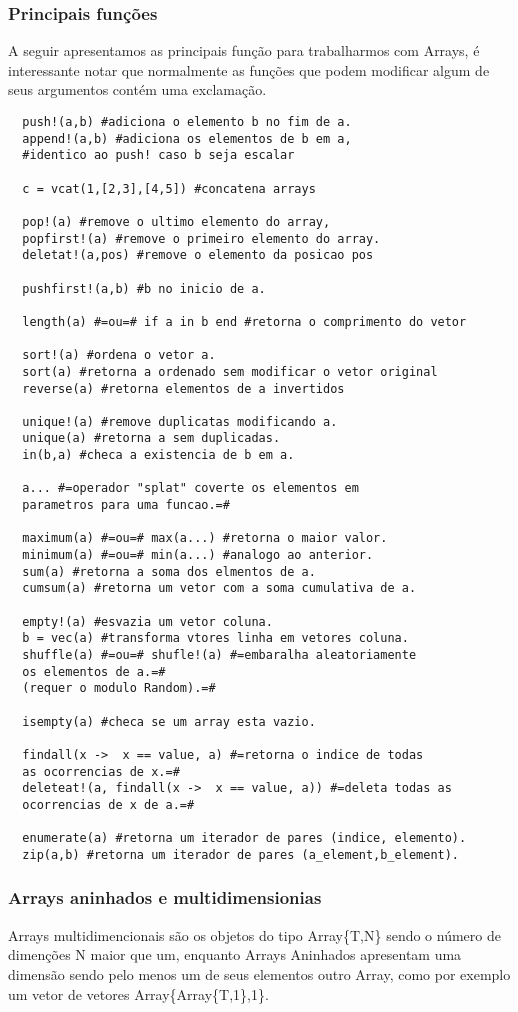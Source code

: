 \subsubsection{Principais funções}
A seguir apresentamos as principais função para trabalharmos com Arrays, é interessante notar que normalmente as funções que podem modificar algum de seus argumentos contém uma exclamação.
\begin{lstlisting}
  push!(a,b) #adiciona o elemento b no fim de a.
  append!(a,b) #adiciona os elementos de b em a,
  #identico ao push! caso b seja escalar

  c = vcat(1,[2,3],[4,5]) #concatena arrays

  pop!(a) #remove o ultimo elemento do array,
  popfirst!(a) #remove o primeiro elemento do array.
  deletat!(a,pos) #remove o elemento da posicao pos

  pushfirst!(a,b) #b no inicio de a.

  length(a) #=ou=# if a in b end #retorna o comprimento do vetor

  sort!(a) #ordena o vetor a.
  sort(a) #retorna a ordenado sem modificar o vetor original
  reverse(a) #retorna elementos de a invertidos

  unique!(a) #remove duplicatas modificando a.
  unique(a) #retorna a sem duplicadas. 
  in(b,a) #checa a existencia de b em a.

  a... #=operador "splat" coverte os elementos em 
  parametros para uma funcao.=#

  maximum(a) #=ou=# max(a...) #retorna o maior valor.
  minimum(a) #=ou=# min(a...) #analogo ao anterior.
  sum(a) #retorna a soma dos elmentos de a.
  cumsum(a) #retorna um vetor com a soma cumulativa de a.

  empty!(a) #esvazia um vetor coluna.
  b = vec(a) #transforma vtores linha em vetores coluna.
  shuffle(a) #=ou=# shufle!(a) #=embaralha aleatoriamente 
  os elementos de a.=# 
  (requer o modulo Random).=#

  isempty(a) #checa se um array esta vazio.

  findall(x ->  x == value, a) #=retorna o indice de todas
  as ocorrencias de x.=#
  deleteat!(a, findall(x ->  x == value, a)) #=deleta todas as 
  ocorrencias de x de a.=#

  enumerate(a) #retorna um iterador de pares (indice, elemento).
  zip(a,b) #retorna um iterador de pares (a_element,b_element).
\end{lstlisting}

\subsubsection{Arrays aninhados e multidimensionias}
Arrays multidimencionais são os objetos do tipo Array\{T,N\} sendo o número de dimenções N maior que um, enquanto Arrays Aninhados apresentam uma dimensão sendo pelo menos um de seus elementos outro Array, como por exemplo um vetor de vetores Array\{Array\{T,1\},1\}.

